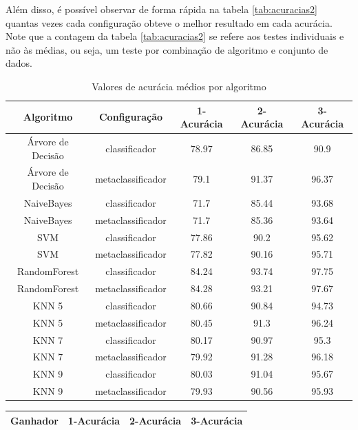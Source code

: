 {Além disso, é possível observar de forma rápida na tabela \ref{tab:acuracias2} quantas vezes cada configuração obteve o melhor resultado em cada acurácia.
Note que a contagem da tabela \ref{tab:acuracias2} se refere aos testes individuais e não às médias, ou seja, um teste por combinação de algoritmo e conjunto de dados.


\begin{table}[h!]
  \begin{center}
    \resizebox{\textwidth}{!} {
    \begin{tabular}{ccccc}
      \hline
      \textbf{Algoritmo} & \textbf{Configuração} & \textbf{1-Acurácia} & \textbf{2-Acurácia} & \textbf{3-Acurácia}\\
      \hline

Árvore de Decisão	&	classificador	&	78.97	&	86.85	&	90.9	\\
Árvore de Decisão	&	metaclassificador	&	79.1	&	91.37	&	96.37	\\
NaiveBayes	&	classificador	&	71.7	&	85.44	&	93.68	\\
NaiveBayes	&	metaclassificador	&	71.7	&	85.36	&	93.64	\\
SVM	&	classificador	&	77.86	&	90.2	&	95.62	\\
SVM	&	metaclassificador	&	77.82	&	90.16	&	95.71	\\
RandomForest	&	classificador	&	84.24	&	93.74	&	97.75	\\
RandomForest	&	metaclassificador	&	84.28	&	93.21	&	97.67	\\
KNN 5	&	classificador	&	80.66	&	90.84	&	94.73	\\
KNN 5	&	metaclassificador	&	80.45	&	91.3	&	96.24	\\
KNN 7	&	classificador	&	80.17	&	90.97	&	95.3	\\
KNN 7	&	metaclassificador	&	79.92	&	91.28	&	96.18	\\
KNN 9	&	classificador	&	80.03	&	91.04	&	95.67	\\
KNN 9	&	metaclassificador	&	79.93	&	90.56	&	95.93	\\

      \hline
    \end{tabular}
    }
    \caption{Valores de acurácia médios por algoritmo}
    \label{tab:acuracias}
  \end{center}
\end{table}

\begin{table}[h!]
  \begin{center}
    \begin{tabular}{cccc}
      \hline
      \textbf{Ganhador} & \textbf{1-Acurácia} & \textbf{2-Acurácia} & \textbf{3-Acurácia}\\
      \hline


\end{tabular}
\end{center}
\end{table}}
